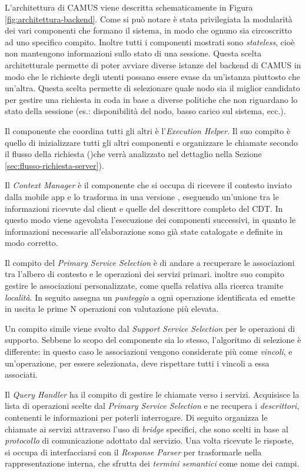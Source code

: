 L'architettura di CAMUS viene descritta schematicamente in Figura \ref{fig:architettura-backend}. Come si può notare è stata privilegiata la modularità dei vari componenti che formano il sistema, in modo che ognuno sia circoscritto ad uno specifico compito. Inoltre tutti i componenti mostrati sono \emph{stateless}, cioè non mantengono informazioni sullo stato di una sessione. Questa scelta architetturale permette di poter avviare diverse istanze del backend di CAMUS in modo che le richieste degli utenti possano essere evase da un'istanza piuttosto che un'altra. Questa scelta permette di selezionare quale nodo sia il miglior candidato per gestire una richiesta in coda in base a diverse politiche che non riguardano lo stato della sessione (es.: disponibilità del nodo, basso carico sul sistema, ecc.).

Il componente che coordina tutti gli altri è l'\emph{Execution Helper}. Il suo compito è quello di inizializzare tutti gli altri componenti e organizzare le chiamate secondo il flusso della richiesta ()che verrà analizzato nel dettaglio nella Sezione \ref{sec:flusso-richiesta-server}).

Il \emph{Context Manager} è il componente che si occupa di ricevere il contesto inviato dalla mobile app e lo trasforma in una versione , eseguendo un'unione tra le informazioni ricevute dal client e quelle del descrittore completo del CDT. In questo modo viene agevolata l'esecuzione dei componenti successivi, in quanto le informazioni necessarie all'elaborazione sono già state catalogate e definite in modo corretto.

Il compito del \emph{Primary Service Selection} è di andare a recuperare le associazioni tra l'albero di contesto e le operazioni dei servizi primari. \upe inoltre suo compito gestire le associazioni personalizzate, come quella relativa alla ricerca tramite \emph{località}. In seguito assegna un \emph{punteggio} a ogni operazione identificata ed emette in uscita le prime N operazioni con valutazione più elevata.

Un compito simile viene svolto dal \emph{Support Service Selection} per le operazioni di supporto. Sebbene lo scopo del componente sia lo stesso, l'algoritmo di selezione è differente: in questo caso le associazioni vengono considerate più come \emph{vincoli}, e un'operazione, per essere selezionata, deve rispettare tutti i vincoli a essa associati.

Il \emph{Query Handler} ha il compito di gestire le chiamate verso i servizi. Acquisisce la lista di operazioni scelte dal \emph{Primary Service Selection} e ne recupera i \emph{descrittori}, contenenti le informazioni per poterli interrogare. Di seguito organizza le chiamate ai servizi attraverso l'uso di \emph{bridge} specifici, che sono scelti in base al \emph{protocollo} di comunicazione adottato dal servizio. Una volta ricevute le risposte, si occupa di interfacciarsi con il \emph{Response Parser} per trasformarle nella rappresentazione interna, che sfrutta dei \emph{termini semantici} come nome dei campi.

